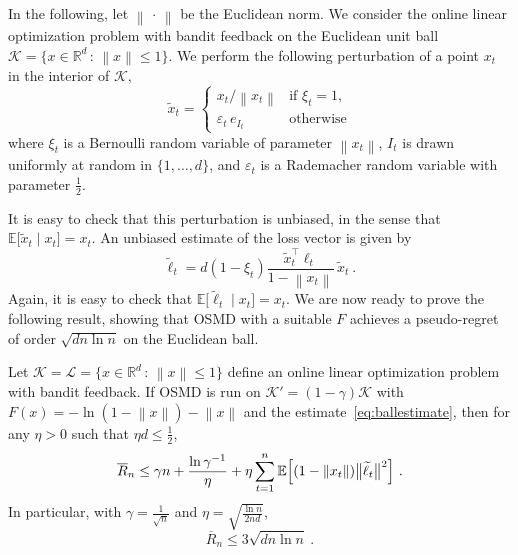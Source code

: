 \documentclass[11pt]{hackednow}
\newcommand{\E}{\mathbb{E}}
\newcommand{\R}{\mathbb{R}}
\newcommand{\cL}{\mathcal{L}}
\newcommand{\cK}{\mathcal{K}}
\newcommand{\oR}{\overline{R}}
\renewcommand{\epsilon}{\varepsilon}
\renewcommand{\tilde}{\widetilde}
\newcommand{\norm}[1]{\left\|{#1}\right\|}
\begin{document}
In the following, let $\norm{\,\cdot\,}$ be the Euclidean norm. We consider the online linear optimization problem with bandit feedback on the Euclidean unit ball $\cK = \{x \in \R^d \,:\, \norm{x} \leq 1 \}$. We perform the following perturbation of a point $x_t$ in the interior of $\cK$,
\[
    \tilde{x}_t = \left\{ \begin{array}{cl}
        x_t / \norm{x_t} & \text{if $\xi_t = 1$,}
    \\
        \epsilon_t\,e_{I_t} & \text{otherwise}
    \end{array} \right.
\]
where $\xi_t$ is a Bernoulli random variable of parameter $\norm{x_t}$, $I_t$ is drawn uniformly at random in $\{1, \hdots, d\}$, and $\epsilon_t$ is a Rademacher random variable with parameter $\frac12$.

It is easy to check that this perturbation is unbiased, in the sense that
$\E\bigl[\tilde{x}_t \mid x_t\bigr] = x_t$.
An unbiased estimate of the loss vector is given by
\begin{equation} \label{eq:ballestimate}
\tilde{\ell}_t = d(1 - \xi_t) \frac{\tilde{x}_t^{\top}\ell_t}{1- \norm{x_t}}\,\tilde{x}_t~.
\end{equation}
Again, it is easy to check that
$\E\bigl[\tilde{\ell}_t \mid x_t\bigr] = x_t$.
We are now ready to prove the following result, showing that OSMD with a suitable $F$ achieves a pseudo-regret of order $\sqrt{dn\ln n}$ on the Euclidean ball.
\begin{theorem} \label{th:ball}
Let $\cK = \cL = \{x \in \R^d \,:\, \norm{x} \leq 1 \}$ define an online linear optimization problem with bandit feedback. If OSMD is run on $\cK' = (1-\gamma)\cK$ with $F(x) = - \ln(1 - \norm{x}) - \norm{x}$ and the estimate~\eqref{eq:ballestimate}, then for any $\eta > 0$ such that $\eta d \leq \frac12$,
\begin{equation} \label{eq:ballregret1}
\oR_n \leq \gamma n + \frac{\ln \gamma^{-1}}{\eta} + \eta \sum_{t=1}^n \E\Bigl[(1 - \norm{x_t})\big\|\tilde{\ell}_t\big\|^2\Bigr]~.
\end{equation}
In particular, with $\gamma = \frac{1}{\sqrt{n}}$ and $\eta= \sqrt{\frac{\ln n}{2 n d}}$,
\begin{equation} \label{eq:ballregret2}
\oR_n \leq  3 \sqrt{d n \ln n}~.
\end{equation}
\end{theorem}
\end{document}
